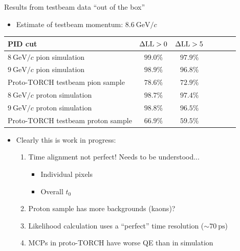 \documentclass{beamer}
\begin{document}
\begin{frame}{Results from testbeam data ``out of the box''}
  \begin{itemize}
      \item{Estimate of testbeam momentum: $\SI{8.6}{\giga\eV/c}$}
  \end{itemize}
  \begin{center}
    \begin{tabular}{lcccccc} 
      \hline
      PID cut                              & $\Delta{\rm LL} > 0$ & $\Delta{\rm LL} > 5$ \\
      \hline
      $\SI{8}{\giga\eV/c}$ pion simulation   & $99.0\%$             & $97.9\%$ \\
      $\SI{9}{\giga\eV/c}$ pion simulation   & $98.9\%$             & $96.8\%$ \\
      Proto-TORCH testbeam pion sample     & $78.6\%$             & $72.9\%$ \\
      \hline
      $\SI{8}{\giga\eV/c}$ proton simulation & $98.7\%$             & $97.4\%$ \\
      $\SI{9}{\giga\eV/c}$ proton simulation & $98.8\%$             & $96.5\%$ \\
      Proto-TORCH testbeam proton sample   & $66.9\%$             & $59.5\%$ \\
      \hline
    \end{tabular}
    \vspace{0.5cm}
    \begin{itemize}
      \item{Clearly this is work in progress:}
      \begin{enumerate}
        \item{Time alignment not perfect! Needs to be understood...}
        \begin{itemize}
          \item{Individual pixels}
          \item{Overall $t_0$}
        \end{itemize}
        \item{Proton sample has more backgrounds (kaons)?}
        \item{Likelihood calculation uses a ``perfect'' time resolution ($\sim\SI{70}{\pico\second}$)}
        \item{MCPs in proto-TORCH have worse QE than in simulation}
      \end{enumerate}
    \end{itemize}
  \end{center}
\end{frame}
\end{document}
